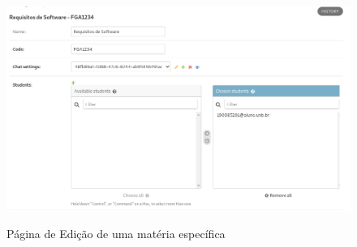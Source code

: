 \begin{figure}[H]
    \centering
    \caption{Página de Edição de uma matéria específica}
    \includegraphics[width=1\textwidth]{figuras/admin4.png}
    \label{fig:report_questions}
\end{figure}